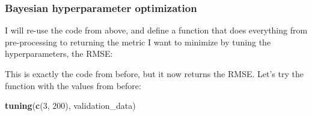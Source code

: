\documentclass[]{gitbook}
\newenvironment{Shaded}{\begin{snugshade}}{\end{snugshade}}
\newcommand{\ControlFlowTok}[1]{\textcolor[rgb]{0.13,0.29,0.53}{\textbf{#1}}}
\newcommand{\DataTypeTok}[1]{\textcolor[rgb]{0.13,0.29,0.53}{#1}}
\newcommand{\DecValTok}[1]{\textcolor[rgb]{0.00,0.00,0.81}{#1}}
\newcommand{\KeywordTok}[1]{\textcolor[rgb]{0.13,0.29,0.53}{\textbf{#1}}}
\newcommand{\NormalTok}[1]{#1}
\newcommand{\OperatorTok}[1]{\textcolor[rgb]{0.81,0.36,0.00}{\textbf{#1}}}
\newcommand{\StringTok}[1]{\textcolor[rgb]{0.31,0.60,0.02}{#1}}
\begin{document}
\hypertarget{bayesian-hyperparameter-optimization}{%
\subsubsection{Bayesian hyperparameter optimization}\label{bayesian-hyperparameter-optimization}}

I will re-use the code from above, and define a function that does everything from pre-processing
to returning the metric I want to minimize by tuning the hyperparameters, the RMSE:

\begin{Shaded}
\end{Shaded}

This is exactly the code from before, but it now returns the RMSE. Let's try the function
with the values from before:

\begin{Shaded}
\begin{Highlighting}[]
\KeywordTok{tuning}\NormalTok{(}\KeywordTok{c}\NormalTok{(}\DecValTok{3}\NormalTok{, }\DecValTok{200}\NormalTok{), validation_data)}
\end{Highlighting}
\end{Shaded}
\end{document}
